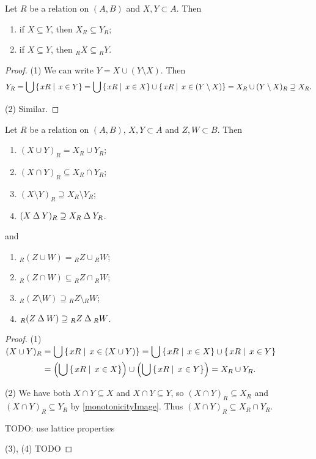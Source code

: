 \begin{corollary} \label{monotonicityImage}
Let $R$ be a relation on $(A, B)$ and $X,Y\subset A$. Then
\begin{enumerate}
\item if $X\subseteq Y$, then $X_R \subseteq Y_R$;
\item if $X\subseteq Y$, then ${_RX} \subseteq {_RY}$.
\end{enumerate}
\end{corollary}
\begin{proof}
(1) We can write $Y = X \cup (Y\setminus X)$. Then
\[ Y_R = \bigcup \left\{\left. xR \;\right|\; x\in Y \right\} = \bigcup \left\{\left. xR \;\right|\; x\in X \right\}\cup\left\{\left. xR \;\right|\; x\in (Y\setminus X) \right\} = X_R \cup (Y\setminus X)_R \supseteq X_R. \]

(2) Similar.
\end{proof}
\begin{corollary} \label{imageRelation} \label{preimageRelation}
Let $R$ be a relation on $(A, B)$, $X,Y\subset A$ and $Z,W\subset B$. Then
\begin{enumerate}
\item $(X\cup Y)_R = X_R\cup Y_R$;
\item $(X\cap Y)_R \subseteq X_R\cap Y_R$;
\item $(X\setminus Y)_R \supseteq X_R\setminus Y_R$;
\item $(X\mathbin{\Delta} Y)_R \supseteq X_R\mathbin{\Delta} Y_R$.
\end{enumerate}
and
\begin{enumerate}
\item $_R(Z\cup W) = {_RZ}\cup {_RW}$;
\item $_R(Z\cap W) \subseteq {_RZ}\cap {_RW}$;
\item $_R(Z\setminus W) \supseteq {_RZ}\setminus {_RW}$;
\item $_R(Z\mathbin{\Delta} W) \supseteq {_RZ}\mathbin{\Delta} {_RW}$.
\end{enumerate}
\end{corollary}
\begin{proof}\mbox{}

(1) $\begin{aligned}[t]
(X\cup Y)_R &= \bigcup \left\{\left. xR \;\right|\; x\in (X\cup Y) \right\} = \bigcup \left\{\left. xR \;\right|\; x\in X \right\}\cup \left\{\left. xR \;\right|\; x\in Y \right\} \\
&= \left(\bigcup \left\{\left. xR \;\right|\; x\in X \right\}\right)\cup \left(\bigcup \left\{\left. xR \;\right|\; x\in Y \right\}\right) = X_R \cup Y_R.
\end{aligned}$

(2) We have both $X\cap Y \subseteq X$ and $X\cap Y \subseteq Y$, so $(X\cap Y)_R \subseteq X_R$ and $(X\cap Y)_R \subseteq Y_R$ by \ref{monotonicityImage}. Thus $(X\cap Y)_R \subseteq X_R\cap Y_R$.

TODO: use lattice properties

(3), (4) TODO
\end{proof}


